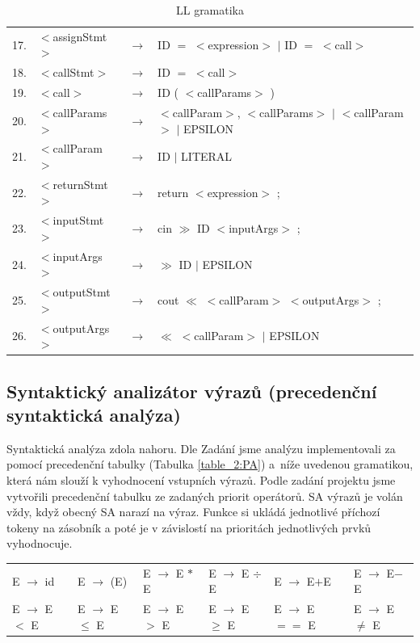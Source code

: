 \documentclass[a4paper, 11pt, titlepage]{article}
\begin{document}
\begin{table}[h]
\begin{center}
\begin{tabular}{|c| l c l|}
	17. & $<$assignStmt$>$    &$ \rightarrow $& ID $=$ $<$expression$>$ $|$ ID $=$ $<$call$>$ \\
	18. & $<$callStmt$>$      &$ \rightarrow $& ID $=$ $<$call$>$ \\
	19. & $<$call$>$          &$ \rightarrow $& ID ( $<$callParams$>$ ) \\
	20. & $<$callParams$>$    &$ \rightarrow $& $<$callParam$>$, $<$callParams$>$ $|$ $<$callParam$>$ $|$ EPSILON \\
	21. & $<$callParam$>$     &$ \rightarrow $& ID $|$ LITERAL \\
	22. & $<$returnStmt$>$    &$ \rightarrow $& return $<$expression$>$ ; \\
	23. & $<$inputStmt$>$     &$ \rightarrow $& cin $\gg$ ID $<$inputArgs$>$ ; \\
	24. & $<$inputArgs$>$     &$ \rightarrow $& $\gg$ ID $|$ EPSILON \\
	25. & $<$outputStmt$>$    &$ \rightarrow $& cout $\ll$ $<$callParam$>$ $<$outputArgs$>$ ; \\
	26. & $<$outputArgs$>$    &$ \rightarrow $& $\ll$ $<$callParam$>$ $|$ EPSILON \\ \hline
	\end{tabular}
	\caption{LL gramatika}
	\label{table_1:LL_gramatic}
	\end{center}
\end{table}

\newpage

\subsection{Syntaktický analizátor výrazů (precedenční syntaktická analýza)}
Syntaktická analýza zdola nahoru. Dle Zadání jsme analýzu implementovali za pomocí precedenční tabulky (Tabulka \ref{table_2:PA}) a~níže uvedenou gramatikou, která nám slouží k vyhodnocení vstupních výrazů. Podle zadání projektu jsme vytvořili precedenční tabulku ze zadaných priorit operátorů. SA výrazů je volán vždy, když obecný SA narazí na výraz. Funkce si ukládá jednotlivé příchozí tokeny na zásobník a poté je v závislostí na prioritách jednotlivých prvků vyhodnocuje. 

\begin{table}[h]
	\begin{center}
		\begin{tabular}{l l l l l l}
			E $ \rightarrow $ id & E $ \rightarrow $ (E) & E $ \rightarrow $ E $ \ast $ E & E $ \rightarrow $ E $ \div $ E & E $ \rightarrow $ E$ + $E & E $ \rightarrow $ E$ - $E \\
			E $ \rightarrow $ E $ < $ E & E $ \rightarrow $ E $ \leq $ E & E $ \rightarrow $ E $ > $ E & E $ \rightarrow $ E $ \geq $ E & E $ \rightarrow $ E $ == $ E & E $ \rightarrow $ E $ \neq $ E 
		\end{tabular}
	\end{center}
\end{table}
\end{document}
